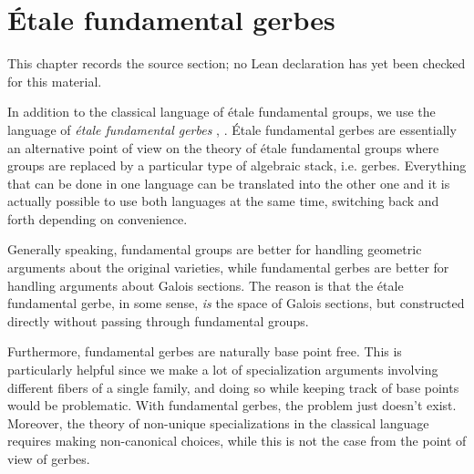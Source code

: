 \chapter{Étale fundamental gerbes}
\label{birational-section-conjecture-strong-birationality-chapter-02}

\begin{remark}
\label{birational-section-conjecture-strong-birationality-chapter-02-source}
This chapter records the source section; no Lean declaration has yet been checked for this material.
\notready
\end{remark}

In addition to the classical language of étale fundamental groups, we use the language of \emph{étale fundamental gerbes} \cite[\S 8, \S 9]{bv15}, \cite[Appendix A]{anab}. Étale fundamental gerbes are essentially an alternative point of view on the theory of étale fundamental groups where groups are replaced by a particular type of algebraic stack, i.e. gerbes. Everything that can be done in one language can be translated into the other one and it is actually possible to use both languages at the same time, switching back and forth depending on convenience.

Generally speaking, fundamental groups are better for handling geometric arguments about the original varieties, while fundamental gerbes are better for handling arguments about Galois sections. The reason is that the étale fundamental gerbe, in some sense, \emph{is} the space of Galois sections, but constructed directly without passing through fundamental groups.

Furthermore, fundamental gerbes are naturally base point free. This is particularly helpful since we make a lot of specialization arguments involving different fibers of a single family, and doing so while keeping track of base points would be problematic. With fundamental gerbes, the problem just doesn't exist. Moreover, the theory of non-unique specializations in the classical language requires making non-canonical choices, while this is not the case from the point of view of gerbes.

